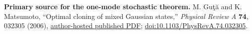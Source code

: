 \documentclass[11pt]{article}
\begin{document}
\medskip
\noindent
\textbf{Primary source for the one-mode stochastic theorem.}
M. Gu\c{t}\u{a} and K. Matsumoto,
``Optimal cloning of mixed Gaussian states,''
\emph{Physical Review A} \textbf{74}, 032305 (2006),
\href{https://www.maths.nottingham.ac.uk/plp/pmzmig/preprints/cloning.pdf}
{author-hosted published PDF};
\href{https://doi.org/10.1103/PhysRevA.74.032305}
{doi:10.1103/PhysRevA.74.032305}.
\end{document}
